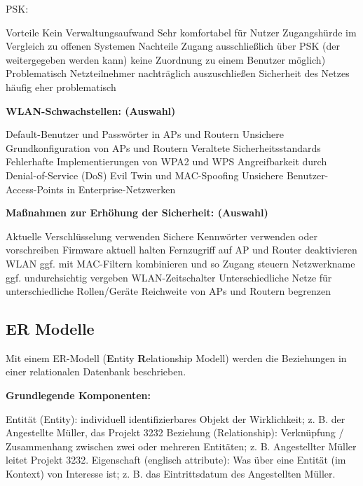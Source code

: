 \documentclass[10pt]{article}
\begin{document}
\begin{flushleft}
\break
PSK:
\begin{outline}
    \1 Vorteile
        \2 Kein Verwaltungsaufwand
        \2 Sehr komfortabel für Nutzer
        \2 Zugangshürde im Vergleich zu offenen Systemen
    \1 Nachteile
        \2 Zugang ausschließlich über PSK (der weitergegeben werden kann) \textrightarrow\space keine Zuordnung zu einem Benutzer möglich)
        \2 Problematisch Netzteilnehmer nachträglich auszuschließen
        \2 Sicherheit des Netzes häufig eher problematisch 
\end{outline}


\textbf{WLAN-Schwachstellen: (Auswahl)}
\begin{outline}
   \1 Default-Benutzer und Passwörter in APs und Routern
   \1 Unsichere Grundkonfiguration von APs und Routern
   \1 Veraltete Sicherheitsstandards
   \1 Fehlerhafte Implementierungen von WPA2 und WPS
   \1 Angreifbarkeit durch Denial-of-Service (DoS)
   \1 Evil Twin und MAC-Spoofing
   \1 Unsichere Benutzer-Access-Points in Enterprise-Netzwerken
\end{outline}

\textbf{Maßnahmen zur Erhöhung der Sicherheit: (Auswahl)}
\begin{outline}
    \1 Aktuelle Verschlüsselung verwenden
    \1 Sichere Kennwörter verwenden oder vorschreiben
    \1 Firmware aktuell halten
    \1 Fernzugriff auf AP und Router deaktivieren
    \1 WLAN ggf. mit MAC-Filtern kombinieren und so Zugang steuern
    \1 Netzwerkname ggf. undurchsichtig vergeben
    \1 WLAN-Zeitschalter
    \1 Unterschiedliche Netze für unterschiedliche Rollen/Geräte
    \1 Reichweite von APs und Routern begrenzen
\end{outline}

\subsection{ER Modelle}

Mit einem ER-Modell (\textbf{E}ntity \textbf{R}elationship Modell) werden die Beziehungen in einer relationalen Datenbank beschrieben.

\textbf{Grundlegende Komponenten:}
\begin{outline}
    \1 Entität (Entity): individuell identifizierbares Objekt der Wirklichkeit; z. B. der Angestellte Müller, das Projekt 3232
    \1 Beziehung (Relationship): Verknüpfung / Zusammenhang zwischen zwei oder mehreren Entitäten; z. B. Angestellter Müller leitet Projekt 3232.
    \1 Eigenschaft (englisch attribute): Was über eine Entität (im Kontext) von Interesse ist; z. B. das Eintrittsdatum des Angestellten Müller.
\end{outline}


\end{flushleft}
\end{document}
